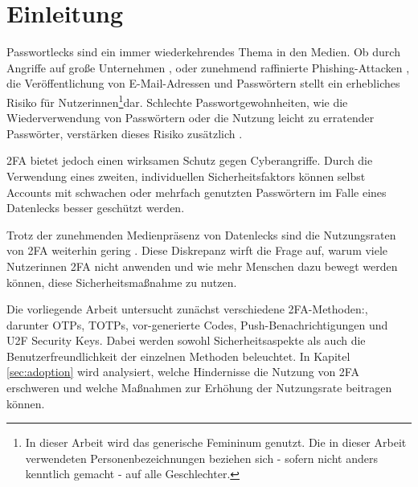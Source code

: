\newcommand{\gfn}{\footnote{In dieser Arbeit wird das generische Femininum genutzt. Die in dieser Arbeit verwendeten Personenbezeichnungen beziehen sich - sofern nicht anders kenntlich gemacht - auf alle Geschlechter.}}

\chapter{Einleitung}

Passwortlecks sind ein immer wiederkehrendes Thema in den Medien. Ob durch Angriffe auf große Unternehmen \parencite{mccandlessWorldsBiggest2024}, oder zunehmend raffinierte Phishing-Attacken \parencite{colnagoItsNot2018}, die Veröffentlichung von E-Mail-Adressen und Passwörtern stellt ein erhebliches Risiko für Nutzerinnen\gfn dar. Schlechte Passwortgewohnheiten, wie die Wiederverwendung von Passwörtern oder die Nutzung leicht zu erratender Passwörter, verstärken dieses Risiko zusätzlich \parencite{colnagoItsNot2018}.

\ac{2FA} bietet jedoch einen wirksamen Schutz gegen Cyberangriffe. Durch die Verwendung eines zweiten, individuellen Sicherheitsfaktors können selbst Accounts mit schwachen oder mehrfach genutzten Passwörtern im Falle eines Datenlecks besser geschützt werden.

Trotz der zunehmenden Medienpräsenz von Datenlecks sind die Nutzungsraten von 2FA weiterhin gering \parencite{petsasTwofactorAuthentication2015, ackermanImpedimentsAdoption2020}.  Diese Diskrepanz wirft die Frage auf, warum viele Nutzerinnen \ac{2FA} nicht anwenden und wie mehr Menschen dazu bewegt werden können, diese Sicherheitsmaßnahme zu nutzen.


Die vorliegende Arbeit untersucht zunächst verschiedene \ac{2FA}-Methoden:, darunter \aclp{OTP}, \aclp{TOTP}, vor-generierte Codes, Push-Benachrichtigungen und \ac{U2F} Security Keys. Dabei werden sowohl Sicherheitsaspekte als auch die Benutzerfreundlichkeit der einzelnen Methoden beleuchtet. In Kapitel \ref{sec:adoption} wird analysiert, welche Hindernisse die Nutzung von \ac{2FA} erschweren und welche Maßnahmen zur Erhöhung der Nutzungsrate beitragen können.
